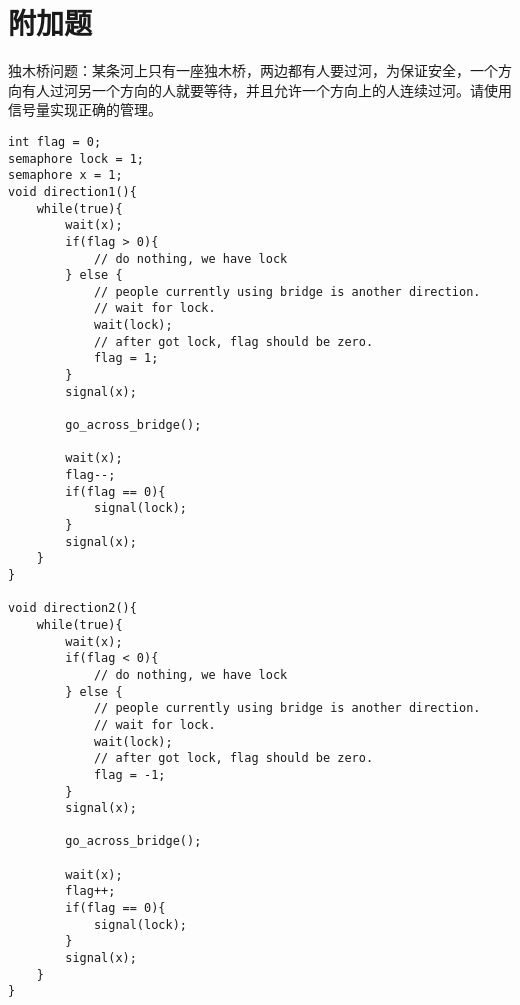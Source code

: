 \documentclass{ctexart}
\begin{document}
\section{附加题}
\begin{outline}[enumerate]
    \1 独木桥问题：某条河上只有一座独木桥，两边都有人要过河，为保证安全，一个方向有人过河另一个方向的人就要等待，并且允许一个方向上的人连续过河。请使用信号量实现正确的管理。
\begin{verbatim}
int flag = 0;
semaphore lock = 1;
semaphore x = 1;
void direction1(){
    while(true){
        wait(x);
        if(flag > 0){
            // do nothing, we have lock
        } else {
            // people currently using bridge is another direction.
            // wait for lock.
            wait(lock);
            // after got lock, flag should be zero.
            flag = 1;
        }
        signal(x);

        go_across_bridge();

        wait(x);
        flag--;
        if(flag == 0){
            signal(lock);
        }
        signal(x);
    }
}

void direction2(){
    while(true){
        wait(x);
        if(flag < 0){
            // do nothing, we have lock
        } else {
            // people currently using bridge is another direction.
            // wait for lock.
            wait(lock);
            // after got lock, flag should be zero.
            flag = -1;
        }
        signal(x);

        go_across_bridge();

        wait(x);
        flag++;
        if(flag == 0){
            signal(lock);
        }
        signal(x);
    }
}
\end{verbatim}
    
\end{outline}
\end{document}

